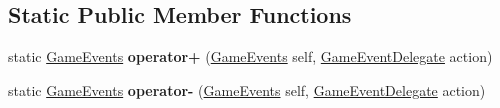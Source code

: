 \subsection*{Static Public Member Functions}
\begin{DoxyCompactItemize}
\item 
\hypertarget{class_skyrates_1_1_game_1_1_event_1_1_game_events_ac5d90ed46a88aaf4f375d88dce20c76c}{static \hyperlink{class_skyrates_1_1_game_1_1_event_1_1_game_events}{Game\-Events} {\bfseries operator+} (\hyperlink{class_skyrates_1_1_game_1_1_event_1_1_game_events}{Game\-Events} self, \hyperlink{namespace_skyrates_1_1_game_1_1_event_a06bcdcadb00cfbf4d4ebd1b2e6ad623d}{Game\-Event\-Delegate} action)}\label{class_skyrates_1_1_game_1_1_event_1_1_game_events_ac5d90ed46a88aaf4f375d88dce20c76c}

\item 
\hypertarget{class_skyrates_1_1_game_1_1_event_1_1_game_events_a1f201dedfa6f707cbd5a34fdf340294c}{static \hyperlink{class_skyrates_1_1_game_1_1_event_1_1_game_events}{Game\-Events} {\bfseries operator-\/} (\hyperlink{class_skyrates_1_1_game_1_1_event_1_1_game_events}{Game\-Events} self, \hyperlink{namespace_skyrates_1_1_game_1_1_event_a06bcdcadb00cfbf4d4ebd1b2e6ad623d}{Game\-Event\-Delegate} action)}\label{class_skyrates_1_1_game_1_1_event_1_1_game_events_a1f201dedfa6f707cbd5a34fdf340294c}

\end{DoxyCompactItemize}
